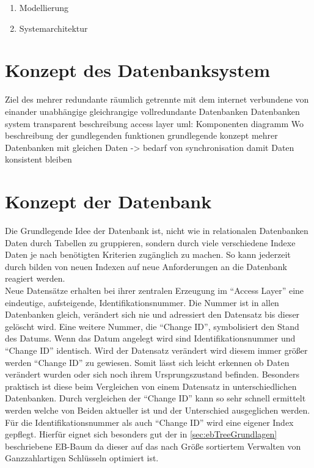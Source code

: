 \documentclass[a4paper,11pt,oneside,%
headsepline,												%
footsepline,												%
bibtotocnumbered									%
]{scrreprt}
\begin{document}
		\begin{enumerate}[1.]
			\item Modellierung
			\item Systemarchitektur
		\end{enumerate}
		
\section{Konzept des Datenbanksystem}
Ziel des
mehrer redundante räumlich getrennte mit dem internet verbundene von einander unabhängige gleichrangige vollredundante Datenbanken
Datenbanken system transparent
beschreibung access layer
uml: Komponenten diagramm
Wo beschreibung der gundlegenden funktionen
grundlegende konzept mehrer Datenbanken mit gleichen Daten -> bedarf von synchronisation damit Daten konsistent bleiben

\section{Konzept der Datenbank}
Die Grundlegende Idee der Datenbank ist, nicht wie in relationalen Datenbanken Daten durch Tabellen zu gruppieren, sondern durch viele verschiedene Indexe Daten je nach benötigten Kriterien  zugänglich zu machen. So kann jederzeit durch bilden von neuen Indexen auf neue Anforderungen an die Datenbank reagiert werden.\\

Neue Datensätze erhalten bei ihrer zentralen Erzeugung im \enquote{Access Layer} eine eindeutige, aufsteigende, Identifikationsnummer. Die Nummer ist in allen Datenbanken gleich, verändert sich nie und adressiert den Datensatz bis dieser gelöscht wird. Eine weitere Nummer, die \enquote{Change ID}, symbolisiert den Stand des Datums. Wenn das Datum angelegt wird sind Identifikationsnummer und \enquote{Change ID} identisch. Wird der Datensatz verändert wird diesem immer größer werden \enquote{Change ID} zu gewiesen. Somit lässt sich leicht erkennen ob Daten verändert wurden oder sich noch ihrem Ursprungszustand befinden. Besonders praktisch ist diese beim Vergleichen von einem Datensatz in unterschiedlichen Datenbanken. Durch vergleichen der \enquote{Change ID} kann so sehr schnell ermittelt werden welche von Beiden aktueller ist und der Unterschied ausgeglichen werden.\\

Für die Identifikationsnummer als auch \enquote{Change ID} wird eine eigener Index gepflegt. Hierfür eignet sich besonders gut der in \autoref{sec:ebTreeGrundlagen} beschriebene \ac{EB-Baum} da dieser auf das nach Größe sortiertem Verwalten von Ganzzahlartigen Schlüsseln optimiert ist. 
\end{document}
